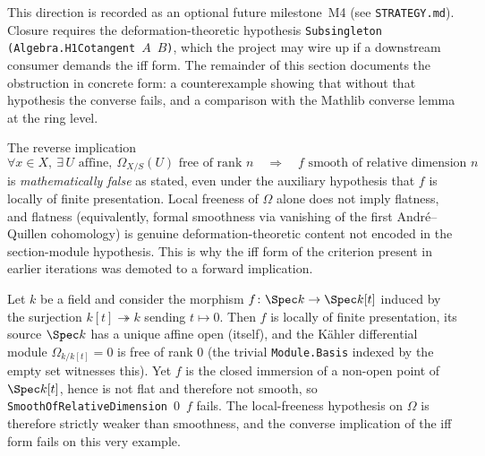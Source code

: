 This direction is recorded as an optional future milestone~M4 (see \texttt{STRATEGY.md}). Closure requires the deformation-theoretic hypothesis \texttt{Subsingleton (Algebra.H1Cotangent}~\(A\)~\(B\)\texttt{)}, which the project may wire up if a downstream consumer demands the iff form. The remainder of this section documents the obstruction in concrete form: a counterexample showing that without that hypothesis the converse fails, and a comparison with the Mathlib converse lemma at the ring level.

The reverse implication
\[
  \forall x\in X,\ \exists\,U\text{ affine},\ \Omega_{X/S}(U)\text{ free of rank }n
  \quad\Longrightarrow\quad f \text{ smooth of relative dimension } n
\]
is \emph{mathematically false} as stated, even under the auxiliary hypothesis that \(f\) is locally of finite presentation. Local freeness of \(\Omega\) alone does not imply flatness, and flatness (equivalently, formal smoothness via vanishing of the first Andr\'e--Quillen cohomology) is genuine deformation-theoretic content not encoded in the section-module hypothesis. This is why the iff form of the criterion present in earlier iterations was demoted to a forward implication.

\begin{remark}
  \label{rem:converse_counterexample}
  Let \(k\) be a field and consider the morphism \(f \colon \Spec k \to \Spec k[t]\) induced by the surjection \(k[t] \twoheadrightarrow k\) sending \(t \mapsto 0\). Then \(f\) is locally of finite presentation, its source \(\Spec k\) has a unique affine open (itself), and the K\"ahler differential module \(\Omega_{k/k[t]} = 0\) is free of rank \(0\) (the trivial \texttt{Module.Basis} indexed by the empty set witnesses this). Yet \(f\) is the closed immersion of a non-open point of \(\Spec k[t]\), hence is not flat and therefore not smooth, so \texttt{SmoothOfRelativeDimension}~\(0\)~\(f\) fails. The local-freeness hypothesis on \(\Omega\) is therefore strictly weaker than smoothness, and the converse implication of the iff form fails on this very example.
\end{remark}

